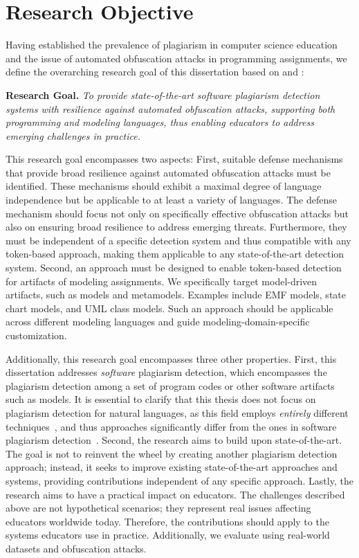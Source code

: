 \section{Research Objective}\label{sec:intro-objective}

Having established the prevalence of plagiarism in computer science education and the issue of automated obfuscation attacks in programming assignments, we define the overarching research goal of this dissertation based on  and :

\begin{myquote}
\textbf{Research Goal.}
\textit{To provide state-of-the-art software plagiarism detection systems with resilience against automated obfuscation attacks, supporting both programming and modeling languages, thus enabling educators to address emerging challenges in practice.} 
\end{myquote}

This research goal encompasses two aspects:
First, suitable defense mechanisms that provide broad resilience against automated obfuscation attacks must be identified. These mechanisms should exhibit a maximal degree of language independence but be applicable to at least a variety of languages.
The defense mechanism should focus not only on specifically effective obfuscation attacks but also on ensuring broad resilience to address emerging threats. Furthermore, they must be independent of a specific detection system and thus compatible with any token-based approach, making them applicable to any state-of-the-art detection system.
%
Second, an approach must be designed to enable token-based detection for artifacts of modeling assignments.
We specifically target model-driven artifacts, such as models and metamodels. Examples include \ac{EMF} models, state chart models, and \ac{UML} class models. Such an approach should be applicable across different modeling languages and guide modeling-domain-specific customization.

Additionally, this research goal encompasses three other properties. First, this dissertation addresses \textit{software} plagiarism detection, which encompasses the plagiarism detection among a set of program codes or other software artifacts such as models. It is essential to clarify that this thesis does not focus on plagiarism detection for natural languages, as this field employs \textit{entirely} different techniques~\cite{Lancaster2005}, and thus approaches significantly differ from the ones in software plagiarism detection~\cite{Simon2013, Simon2014b}.
%
Second, the research aims to build upon state-of-the-art. The goal is not to reinvent the wheel by creating another plagiarism detection approach; instead, it seeks to improve existing state-of-the-art approaches and systems, providing contributions independent of any specific approach.
%
Lastly, the research aims to have a practical impact on educators. The challenges described above are not hypothetical scenarios; they represent real issues affecting educators worldwide today. Therefore, the contributions should apply to the systems educators use in practice. Additionally, we evaluate using real-world datasets and obfuscation attacks.

